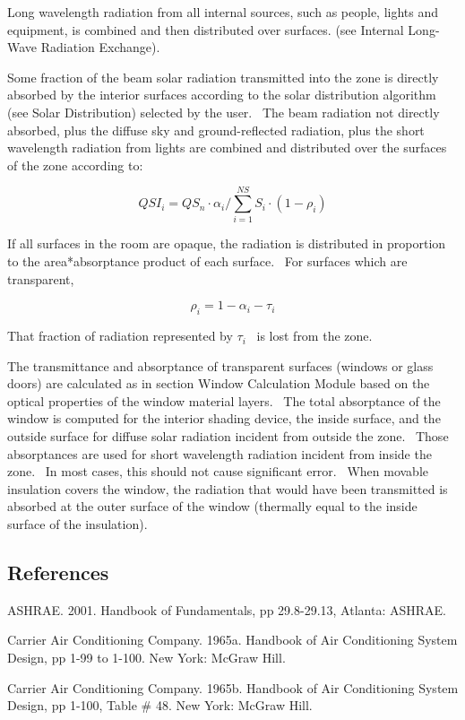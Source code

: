 Long wavelength radiation from all internal sources, such as people, lights and equipment, is combined and then distributed over surfaces. (see Internal Long-Wave Radiation Exchange).

Some fraction of the beam solar radiation transmitted into the zone is directly absorbed by the interior surfaces according to the solar distribution algorithm (see Solar Distribution) selected by the user.~ The beam radiation not directly absorbed, plus the diffuse sky and ground-reflected radiation, plus the short wavelength radiation from lights are combined and distributed over the surfaces of the zone according to:

\begin{equation}
QS{I_i} = Q{S_n}\cdot {\alpha_i}/\sum\limits_{i = 1}^{NS} {{S_i}\cdot (1 - {\rho_i})}
\end{equation}

If all surfaces in the room are opaque, the radiation is distributed in proportion to the area*absorptance product of each surface.~ For surfaces which are transparent,

\begin{equation}
{\rho_i} = 1 - {\alpha_i} - {\tau_i}
\end{equation}

That fraction of radiation represented by \({\tau_i}\) ~is lost from the zone.

The transmittance and absorptance of transparent surfaces (windows or glass doors) are calculated as in section Window Calculation Module based on the optical properties of the window material layers.~ The total absorptance of the window is computed for the interior shading device, the inside surface, and the outside surface for diffuse solar radiation incident from outside the zone.~ Those absorptances are used for short wavelength radiation incident from inside the zone.~ In most cases, this should not cause significant error.~ When movable insulation covers the window, the radiation that would have been transmitted is absorbed at the outer surface of the window (thermally equal to the inside surface of the insulation).

\subsection{References}\label{references-057}

ASHRAE. 2001. Handbook of Fundamentals, pp 29.8-29.13, Atlanta: ASHRAE.

Carrier Air Conditioning Company. 1965a. Handbook of Air Conditioning System Design, pp 1-99 to 1-100. New York: McGraw Hill.

Carrier Air Conditioning Company. 1965b. Handbook of Air Conditioning System Design, pp 1-100, Table \# 48. New York: McGraw Hill.
